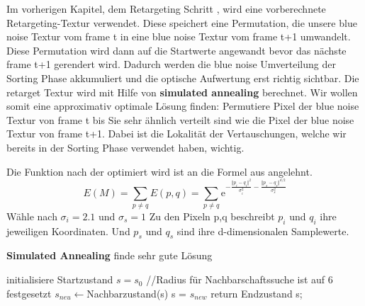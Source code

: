 Im vorherigen Kapitel, dem Retargeting Schritt ,
wird eine vorberechnete Retargeting-Textur verwendet. Diese speichert eine
Permutation, die unsere blue noise Textur vom frame t in eine
blue noise Textur vom frame t+1 umwandelt. Diese Permutation wird 
dann auf die Startwerte angewandt bevor das nächste frame t+1 gerendert wird.
Dadurch werden die blue noise Umverteilung der Sorting Phase 
akkumuliert und die optische Aufwertung erst richtig sichtbar.
Die retarget Textur wird mit Hilfe von \textbf{simulated annealing} 
\cite{hal02158423} berechnet. Wir wollen somit eine approximativ 
optimale Lösung finden: Permutiere Pixel der blue noise Textur von 
frame t bis Sie sehr ähnlich verteilt sind wie die Pixel der blue noise
Textur von frame t+1. Dabei ist die Lokalität der Vertauschungen, 
welche wir bereits in der Sorting Phase
verwendet haben, wichtig.

Die Funktion nach der optimiert wird ist an die Formel aus\cite{georgiev2016blue} angelehnt.
\begin{equation}\label{eq:pixel energy function}
    E(M) = \sum_{p \neq q}E(p,q) = 
           \sum_{p \neq q} \mathrm{e}^{-\frac{\Vert{p_{i}-q_{i}}\Vert^{2}}{\sigma_{i}^{2}} -
           \frac{\Vert{p_{s}-q_{s}}\Vert^{d/2}}{\sigma_{s}^{2}}}
\end{equation}
Wähle nach \cite{ulichney1993void} $\sigma_{i} = 2.1$ und $\sigma_{s} = 1$ 
Zu den Pixeln p,q beschreibt $p_{i}$ und $q_{i}$ ihre jeweiligen Koordinaten.
Und $p_{s}$ und $q_{s}$ sind ihre d-dimensionalen Samplewerte.


\begin{algorithm}[H]
    \caption{\textbf{Simulated Annealing} finde sehr gute Lösung}
    \begin{algorithmic}[1]
        \State initialisiere Startzustand $s=s_{0}$
        \State //Radius für Nachbarschaftssuche ist auf 6 festgesetzt
        \State $s_{neu}\leftarrow$Nachbarzustand(s)
        \State s = $s_{new}$
        \EndIf
        \EndFor
        \State return Endzustand s;
    \end{algorithmic}
    \label{alg:retargeting}
\end{algorithm}

